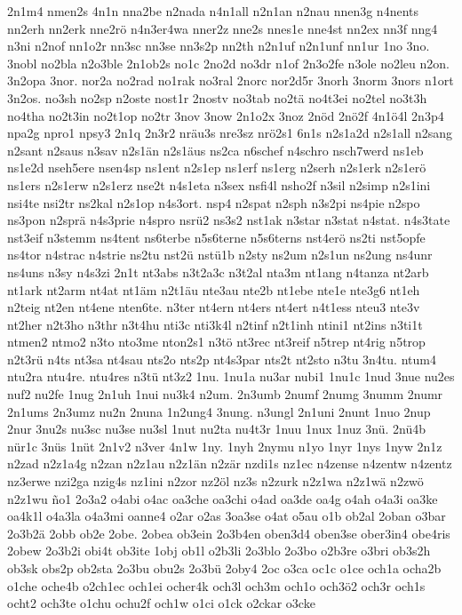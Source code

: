 {2n1m4
nmen2s
4n1n
nna2be
n2nada
n4n1all
n2n1an
n2nau
nnen3g
n4nents
nn2erh
nn2erk
nne2rö
n4n3er4wa
nner2z
nne2s
nnes1e
nne4st
nn2ex
nn3f
nng4
n3ni
n2nof
nn1o2r
nn3sc
nn3se
nn3s2p
nn2th
n2n1uf
n2n1unf
nn1ur
1no
3no.
3nobl
no2bla
n2o3ble
2n1ob2s
no1c
2no2d
no3dr
n1of
2n3o2fe
n3ole
no2leu
n2on.
3n2opa
3nor.
nor2a
no2rad
no1rak
no3ral
2norc
nor2d5r
3norh
3norm
3nors
n1ort
3n2os.
no3sh
no2sp
n2oste
nost1r
2nostv
no3tab
no2tä
no4t3ei
no2tel
no3t3h
no4tha
no2t3in
no2t1op
no2tr
3nov
3now
2n1o2x
3noz
2nöd
2nö2f
4n1ö4l
2n3p4
npa2g
npro1
npsy3
2n1q
2n3r2
nräu3s
nre3sz
nrö2s1
6n1s
n2s1a2d
n2s1all
n2sang
n2sant
n2saus
n3sav
n2s1än
n2s1äus
ns2ca
n6schef
n4schro
nsch7werd
ns1eb
ns1e2d
nseh5ere
nsen4sp
ns1ent
n2s1ep
ns1erf
ns1erg
n2serh
n2s1erk
n2s1erö
ns1ers
n2s1erw
n2s1erz
nse2t
n4s1eta
n3sex
nsfi4l
nsho2f
n3sil
n2simp
n2s1ini
nsi4te
nsi2tr
ns2kal
n2s1op
n4s3ort.
nsp4
n2spat
n2sph
n3s2pi
ns4pie
n2spo
ns3pon
n2sprä
n4s3prie
n4spro
nsrü2
ns3s2
nst1ak
n3star
n3stat
n4stat.
n4s3tate
nst3eif
n3stemm
ns4tent
ns6terbe
n5s6terne
n5s6terns
nst4erö
ns2ti
nst5opfe
ns4tor
n4strac
n4strie
ns2tu
nst2ü
nstü1b
n2sty
ns2um
n2s1un
ns2ung
ns4unr
ns4uns
n3sy
n4s3zi
2n1t
nt3abs
n3t2a3c
n3t2al
nta3m
nt1ang
n4tanza
nt2arb
nt1ark
nt2arm
nt4at
nt1äm
n2t1äu
nte3au
nte2b
nt1ebe
nte1e
nte3g6
nt1eh
n2teig
nt2en
nt4ene
nten6te.
n3ter
nt4ern
nt4ers
nt4ert
n4t1ess
nteu3
nte3v
nt2her
n2t3ho
n3thr
n3t4hu
nti3c
nti3k4l
n2tinf
n2t1inh
ntini1
nt2ins
n3ti1t
ntmen2
ntmo2
n3to
nto3me
nton2s1
n3tö
nt3rec
nt3reif
n5trep
nt4rig
n5trop
n2t3rü
n4ts
nt3sa
nt4sau
nts2o
nts2p
nt4s3par
nts2t
nt2sto
n3tu
3n4tu.
ntum4
ntu2ra
ntu4re.
ntu4res
n3tü
nt3z2
1nu.
1nu1a
nu3ar
nubi1
1nu1c
1nud
3nue
nu2es
nuf2
nu2fe
1nug
2n1uh
1nui
nu3k4
n2um.
2n3umb
2numf
2numg
3numm
2numr
2n1ums
2n3umz
nu2n
2nuna
1n2ung4
3nung.
n3ungl
2n1uni
2nunt
1nuo
2nup
2nur
3nu2s
nu3sc
nu3se
nu3sl
1nut
nu2ta
nu4t3r
1nuu
1nux
1nuz
3nü.
2nü4b
nür1c
3nüs
1nüt
2n1v2
n3ver
4n1w
1ny.
1nyh
2nymu
n1yo
1nyr
1nys
1nyw
2n1z
n2zad
n2z1a4g
n2zan
n2z1au
n2z1än
n2zär
nzdi1s
nz1ec
n4zense
n4zentw
n4zentz
nz3erwe
nzi2ga
nzig4s
nz1ini
n2zor
nz2öl
nz3s
n2zurk
n2z1wa
n2z1wä
n2zwö
n2z1wu
ño1
2o3a2
o4abi
o4ac
oa3che
oa3chi
o4ad
oa3de
oa4g
o4ah
o4a3i
oa3ke
oa4k1l
o4a3la
o4a3mi
oanne4
o2ar
o2as
3oa3se
o4at
o5au
o1b
ob2al
2oban
o3bar
2o3b2ä
2obb
ob2e
2obe.
2obea
ob3ein
2o3b4en
oben3d4
oben3se
ober3in4
obe4ris
2obew
2o3b2i
obi4t
ob3ite
1obj
ob1l
o2b3li
2o3blo
2o3bo
o2b3re
o3bri
ob3s2h
ob3sk
obs2p
ob2sta
2o3bu
obu2s
2o3bü
2oby4
2oc
o3ca
oc1c
o1ce
och1a
ocha2b
o1che
oche4b
o2ch1ec
och1ei
ocher4k
och3l
och3m
och1o
och3ö2
och3r
och1s
ocht2
och3te
o1chu
ochu2f
och1w
o1ci
o1ck
o2ckar
o3cke
}
